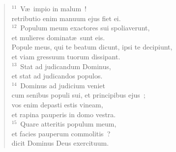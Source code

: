 \begin{verse}
${}^{11}$~V\ae\ impio in malum~!\\ retributio enim manuum ejus fiet ei.\\
${}^{12}$~Populum meum exactores sui spoliaverunt,\\ et mulieres dominat\ae\ sunt eis.\\ Popule meus, qui te beatum dicunt, ipsi te decipiunt,\\ et viam gressuum tuorum dissipant.\\
${}^{13}$~Stat ad judicandum Dominus,\\ et stat ad judicandos populos.\\
${}^{14}$~Dominus ad judicium veniet\\ cum senibus populi sui, et principibus ejus~;\\ vos enim depasti estis vineam,\\ et rapina pauperis in domo vestra.\\
${}^{15}$~Quare atteritis populum meum,\\ et facies pauperum commolitis~?\\ dicit Dominus Deus exercituum.\end{verse}


